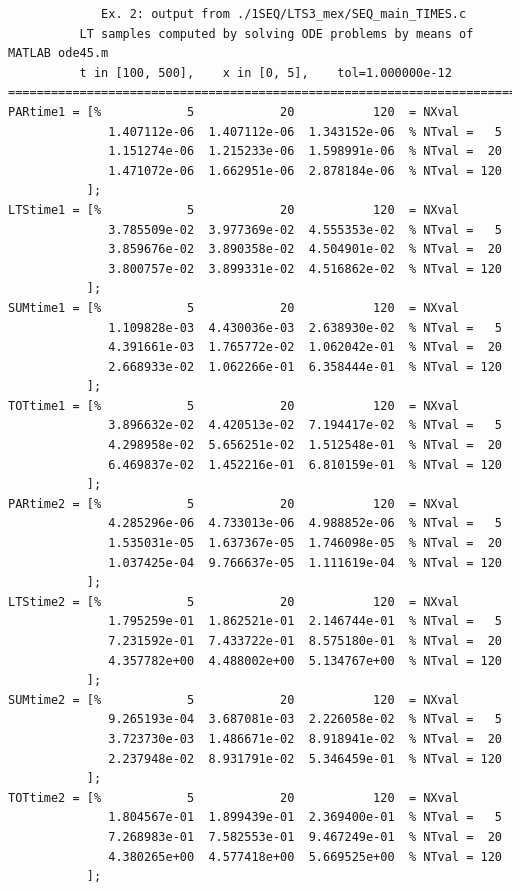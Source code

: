 \documentclass[a4paper,10pt]{report}%
\begin{document}
\begin{lstlisting}
             Ex. 2: output from ./1SEQ/LTS3_mex/SEQ_main_TIMES.c
          LT samples computed by solving ODE problems by means of MATLAB ode45.m
          t in [100, 500],    x in [0, 5],    tol=1.000000e-12
====================================================================================
PARtime1 = [%            5            20           120  = NXval
              1.407112e-06  1.407112e-06  1.343152e-06	% NTval =   5
              1.151274e-06  1.215233e-06  1.598991e-06	% NTval =  20
              1.471072e-06  1.662951e-06  2.878184e-06	% NTval = 120
           ];
LTStime1 = [%            5            20           120  = NXval
              3.785509e-02  3.977369e-02  4.555353e-02	% NTval =   5
              3.859676e-02  3.890358e-02  4.504901e-02	% NTval =  20
              3.800757e-02  3.899331e-02  4.516862e-02	% NTval = 120
           ];
SUMtime1 = [%            5            20           120  = NXval
              1.109828e-03  4.430036e-03  2.638930e-02	% NTval =   5
              4.391661e-03  1.765772e-02  1.062042e-01	% NTval =  20
              2.668933e-02  1.062266e-01  6.358444e-01	% NTval = 120
           ];
TOTtime1 = [%            5            20           120  = NXval
              3.896632e-02  4.420513e-02  7.194417e-02	% NTval =   5
              4.298958e-02  5.656251e-02  1.512548e-01	% NTval =  20
              6.469837e-02  1.452216e-01  6.810159e-01	% NTval = 120
           ];
PARtime2 = [%            5            20           120  = NXval
              4.285296e-06  4.733013e-06  4.988852e-06	% NTval =   5
              1.535031e-05  1.637367e-05  1.746098e-05	% NTval =  20
              1.037425e-04  9.766637e-05  1.111619e-04	% NTval = 120
           ];
LTStime2 = [%            5            20           120  = NXval
              1.795259e-01  1.862521e-01  2.146744e-01	% NTval =   5
              7.231592e-01  7.433722e-01  8.575180e-01	% NTval =  20
              4.357782e+00  4.488002e+00  5.134767e+00	% NTval = 120
           ];
SUMtime2 = [%            5            20           120  = NXval
              9.265193e-04  3.687081e-03  2.226058e-02	% NTval =   5
              3.723730e-03  1.486671e-02  8.918941e-02	% NTval =  20
              2.237948e-02  8.931791e-02  5.346459e-01	% NTval = 120
           ];
TOTtime2 = [%            5            20           120  = NXval
              1.804567e-01  1.899439e-01  2.369400e-01	% NTval =   5
              7.268983e-01  7.582553e-01  9.467249e-01	% NTval =  20
              4.380265e+00  4.577418e+00  5.669525e+00	% NTval = 120
           ];
\end{lstlisting}
\end{document}
